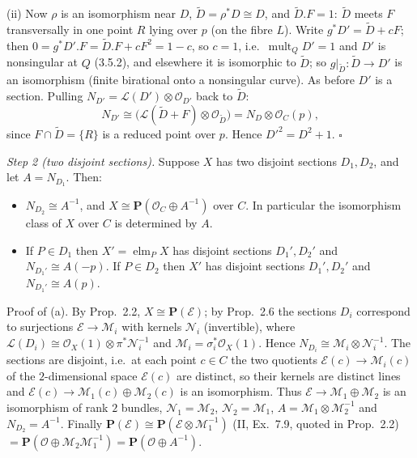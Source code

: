 \documentclass[11pt]{article}
\begin{document}
(ii) Now $\rho$ is an isomorphism near $D$, $\widetilde D=\rho^*D\cong D$, and $\widetilde D.F=1$: $\widetilde D$ meets $F$ transversally in one point $R$ lying over $p$ (on the fibre $L$). Write $g^*D'=\widetilde D+cF$; then $0=g^*D'.F=\widetilde D.F+cF^2=1-c$, so $c=1$, i.e.\ $\operatorname{mult}_QD'=1$ and $D'$ is nonsingular at $Q$ (3.5.2), and elsewhere it is isomorphic to $\widetilde D$; so $g|_{\widetilde D}:\widetilde D\to D'$ is an isomorphism (finite birational onto a nonsingular curve). As before $D'$ is a section. Pulling $N_{D'}=\mathcal L(D')\otimes\mathcal O_{D'}$ back to $\widetilde D$:
\[
N_{D'}\cong\bigl(\mathcal L(\widetilde D+F)\otimes\mathcal O_{\widetilde D}\bigr)=N_D\otimes\mathcal O_C(p),
\]
since $F\cap\widetilde D=\{R\}$ is a reduced point over $p$. Hence $D'^2=D^2+1$. $\square$

\emph{Step 2 (two disjoint sections).} Suppose $X$ has two disjoint sections $D_1,D_2$, and let $A=N_{D_1}$. Then:
\begin{itemize}
\item[(a)] $N_{D_2}\cong A^{-1}$, and $X\cong\mathbf P(\mathcal O_C\oplus A^{-1})$ over $C$. In particular the isomorphism class of $X$ over $C$ is determined by $A$.
\item[(b)] If $P\in D_1$ then $X'=\operatorname{elm}_PX$ has disjoint sections $D_1',D_2'$ and $N_{D_1'}\cong A(-p)$. If $P\in D_2$ then $X'$ has disjoint sections $D_1',D_2'$ and $N_{D_1'}\cong A(p)$.
\end{itemize}
Proof of (a). By Prop.~2.2, $X\cong\mathbf P(\mathcal E)$; by Prop.~2.6 the sections $D_i$ correspond to surjections $\mathcal E\to\mathcal M_i$ with kernels $\mathcal N_i$ (invertible), where $\mathcal L(D_i)\cong\mathcal O_X(1)\otimes\pi^*\mathcal N_i^{-1}$ and $\mathcal M_i=\sigma_i^*\mathcal O_X(1)$. Hence $N_{D_i}\cong\mathcal M_i\otimes\mathcal N_i^{-1}$. The sections are disjoint, i.e.\ at each point $c\in C$ the two quotients $\mathcal E(c)\to\mathcal M_i(c)$ of the $2$-dimensional space $\mathcal E(c)$ are distinct, so their kernels are distinct lines and $\mathcal E(c)\to\mathcal M_1(c)\oplus\mathcal M_2(c)$ is an isomorphism. Thus $\mathcal E\to\mathcal M_1\oplus\mathcal M_2$ is an isomorphism of rank $2$ bundles, $\mathcal N_1=\mathcal M_2$, $\mathcal N_2=\mathcal M_1$, $A=\mathcal M_1\otimes\mathcal M_2^{-1}$ and $N_{D_2}=A^{-1}$. Finally $\mathbf P(\mathcal E)\cong\mathbf P(\mathcal E\otimes\mathcal M_1^{-1})$ (II, Ex.~7.9, quoted in Prop.~2.2) $=\mathbf P(\mathcal O\oplus\mathcal M_2\mathcal M_1^{-1})=\mathbf P(\mathcal O\oplus A^{-1})$.
\end{document}
